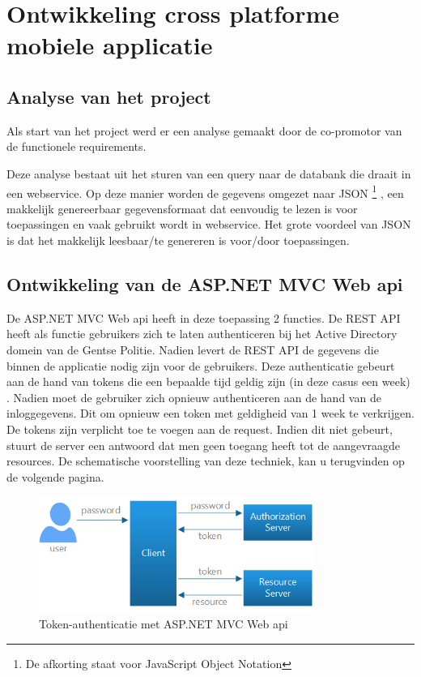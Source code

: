 \chapter{Ontwikkeling cross platforme mobiele applicatie}
\label{ch:ontwikkelingcrossplatformapp}
\section{Analyse van het project}
Als start van het project werd er een analyse gemaakt door de co-promotor van de functionele requirements.

Deze analyse bestaat uit het sturen van een query naar de databank die draait in een webservice.
Op deze manier worden de gegevens omgezet naar JSON \footnote{De afkorting staat voor
JavaScript Object Notation} \citet{inleidingtotjson2017}, een makkelijk genereerbaar gegevensformaat dat eenvoudig te lezen is voor toepassingen en vaak gebruikt wordt in webservice.  Het grote voordeel van JSON
is dat het makkelijk leesbaar/te genereren is voor/door toepassingen.

\section{Ontwikkeling van de ASP.NET MVC Web api}
De ASP.NET MVC Web api heeft in deze toepassing 2 functies. De REST API heeft als functie gebruikers zich te laten
authenticeren bij het Active Directory domein van de Gentse Politie. Nadien levert de REST API de gegevens die binnen
de applicatie nodig zijn voor de gebruikers. Deze authenticatie gebeurt aan de hand van tokens die een bepaalde tijd geldig zijn (in deze casus een week) \citep{authenticatemvcapplication2017}. Nadien moet de gebruiker zich opnieuw authenticeren aan de hand van de inloggegevens. Dit om opnieuw een
token met geldigheid van 1 week te verkrijgen. De tokens zijn verplicht toe te voegen aan de request. Indien dit niet gebeurt, stuurt
de server een antwoord dat men geen toegang heeft tot de aangevraagde resources. De schematische voorstelling van deze techniek,
kan u terugvinden op de volgende pagina.

\begin{figure}[ht!]
\centering
\caption{Token-authenticatie met ASP.NET MVC Web api}
\includegraphics[width=90mm]{./img/authentication.png}
\end{figure}


